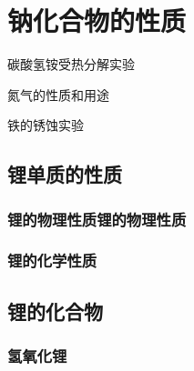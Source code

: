 \documentclass[color=orange]{textbook-cn}%
\begin{document}
\begin{Exercise}
\begin{QsNum}
\item \lipsum[1][1-2]
\item \lipsum[1][1-2]
\item \lipsum[1][1-2]
\item \lipsum[1][1-2]
\item \lipsum[1][1-2]
\item \lipsum[1][1-2]
\item \lipsum[1][1-2]
\item \lipsum[1][1-2]
\end{QsNum}
\tcblower
\lipsum[1]
\end{Exercise}



\section{钠化合物的性质}
\begin{Point}
\lipsum[2]
\end{Point}

\begin{Case}
\item 碳酸氢铵受热分解实验
\item 氮气的性质和用途
\item 铁的锈蚀实验
\end{Case}


\subsection{锂单质的性质}
\subsubsection{锂的物理性质锂的物理性质}
\lipsum[1-2]

\begin{Lemma*}[万有引力定律]
\lipsum[2][1-3]
\end{Lemma*}
\subsubsection{锂的化学性质}
\lipsum[1-2]
\subsection{锂的化合物}
\lipsum[3]
\subsubsection{氢氧化锂}
\lipsum[1-2]
\end{document}
